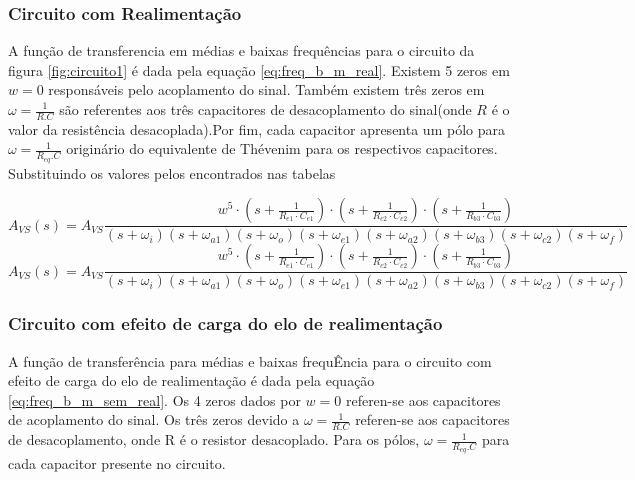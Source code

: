 \documentclass[openright]{normas-utf-tex} %
\begin{document}
\subsubsection{Circuito com Realimentação}
A função de transferencia em médias e baixas frequências para o circuito da figura \ref{fig:circuito1} é dada pela equação \ref{eq:freq_b_m_real}. Existem 5 zeros em $w=0$ responsáveis pelo acoplamento do sinal. Também existem três zeros em $\omega = \frac{1}{R.C}$ são referentes aos três capacitores de desacoplamento do sinal(onde $R$ é o valor da resistência desacoplada).Por fim, cada capacitor apresenta um pólo para $\omega = \frac{1}{R_{eq}.C}$ originário do equivalente de Thévenim para os respectivos capacitores. Substituindo os valores pelos encontrados nas tabelas
%
%

\begin{equation}\label{eq:freq_b_m_real}
A_{VS}(s) = A_{VS} \frac{w^5 \cdot \left(s+\frac{1}{R_{e1}\cdot C_{e1}}\right)\cdot \left(s+\frac{1}{R_{c2}\cdot C_{c2}}\right)\cdot \left(s+\frac{1}{R_{b3}\cdot C_{b3}}\right)}{\left(s+\omega_i\right)\left(s+\omega_{a1}\right)\left(s+\omega_o\right)\left(s+\omega_{e1}\right)\left(s+\omega_{a2}\right)\left(s+\omega_{b3}\right)\left(s+\omega_{c2}\right)\left(s+\omega_{f}\right)}
\end{equation}
%
%
\begin{equation}\label{eq:freq_b_m_real}
A_{VS}(s) = A_{VS}\frac{w^5 \cdot \left(s+\frac{1}{R_{e1}\cdot C_{e1}}\right)\cdot \left(s+\frac{1}{R_{c2}\cdot C_{c2}}\right)\cdot \left(s+\frac{1}{R_{b3}\cdot C_{b3}}\right)}{\left(s+\omega_i\right)\left(s+\omega_{a1}\right)\left(s+\omega_o\right)\left(s+\omega_{e1}\right)\left(s+\omega_{a2}\right)\left(s+\omega_{b3}\right)\left(s+\omega_{c2}\right)\left(s+\omega_{f}\right)}
\end{equation}

\subsubsection{Circuito com efeito de carga do elo de realimentação}

A função de transferência para médias e baixas frequÊncia para o circuito com efeito de carga do elo de realimentação é dada pela equação \ref{eq:freq_b_m_sem_real}. Os 4 zeros dados por $w = 0$ referen-se aos capacitores de acoplamento do sinal. Os três zeros devido a  $\omega = \frac{1}{R.C}$ referen-se aos capacitores de desacoplamento, onde R é o resistor desacoplado. Para os pólos, $\omega = \frac{1}{R_{eq}.C}$ para cada capacitor presente no circuito.
\end{document}
